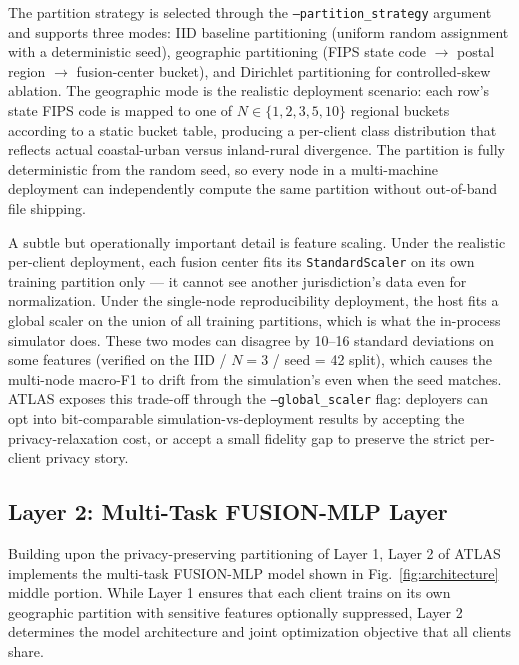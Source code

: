 \documentclass[conference]{IEEEtran}
\begin{document}
The partition strategy is selected through the \texttt{--partition\_strategy} argument and supports three modes: IID baseline partitioning (uniform random assignment with a deterministic seed), geographic partitioning (FIPS state code $\to$ postal region $\to$ fusion-center bucket), and Dirichlet partitioning for controlled-skew ablation. The geographic mode is the realistic deployment scenario: each row's state FIPS code is mapped to one of $N \in \{1, 2, 3, 5, 10\}$ regional buckets according to a static bucket table, producing a per-client class distribution that reflects actual coastal-urban versus inland-rural divergence. The partition is fully deterministic from the random seed, so every node in a multi-machine deployment can independently compute the same partition without out-of-band file shipping.

A subtle but operationally important detail is feature scaling. Under the realistic per-client deployment, each fusion center fits its \texttt{StandardScaler} on its own training partition only --- it cannot see another jurisdiction's data even for normalization. Under the single-node reproducibility deployment, the host fits a global scaler on the union of all training partitions, which is what the in-process simulator does. These two modes can disagree by 10--16 standard deviations on some features (verified on the IID / $N=3$ / seed = 42 split), which causes the multi-node macro-F1 to drift from the simulation's even when the seed matches. ATLAS exposes this trade-off through the \texttt{--global\_scaler} flag: deployers can opt into bit-comparable simulation-vs-deployment results by accepting the privacy-relaxation cost, or accept a small fidelity gap to preserve the strict per-client privacy story.

\subsection{Layer 2: Multi-Task FUSION-MLP Layer}
\label{sec:method:model}

Building upon the privacy-preserving partitioning of Layer 1, Layer 2 of ATLAS implements the multi-task FUSION-MLP model shown in Fig.~\ref{fig:architecture} middle portion. While Layer 1 ensures that each client trains on its own geographic partition with sensitive features optionally suppressed, Layer 2 determines the model architecture and joint optimization objective that all clients share.
\end{document}
